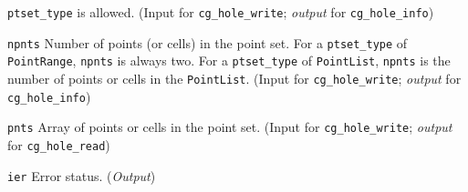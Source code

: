 \begin{Ventryi}{\texttt{ptset\_type}}
      is allowed.
      (\textcolor{input}{Input} for \texttt{cg\_hole\_write};
      \textcolor{output}{\textit{output}} for \texttt{cg\_hole\_info})
\item [\texttt{npnts}]
      Number of points (or cells) in the point set.
      For a \texttt{ptset\_type} of \texttt{PointRange}, \texttt{npnts}
      is always two.
      For a \texttt{ptset\_type} of \texttt{PointList}, \texttt{npnts} is
      the number of points or cells in the \texttt{PointList}.
      (\textcolor{input}{Input} for \texttt{cg\_hole\_write};
      \textcolor{output}{\textit{output}} for \texttt{cg\_hole\_info})
\item [\texttt{pnts}]
      Array of points or cells in the point set.
      (\textcolor{input}{Input} for \texttt{cg\_hole\_write};
      \textcolor{output}{\textit{output}} for \texttt{cg\_hole\_read})
\item [\texttt{ier}]
      Error status.
      (\textcolor{output}{\textit{Output}})
\end{Ventryi}
